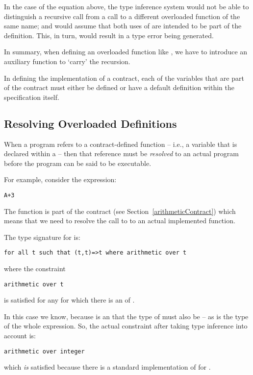 \begin{aside}
\begin{aside}
In the case of the \q{=<} equation above, the type inference system would not be able to distinguish a recursive call from a call to a different overloaded function of the same name; and would assume that both uses of \q{=<} are intended to be part of the definition. This, in turn, would result in a type error being generated.

In summary, when defining an overloaded function like \q{=<}, we have to introduce an auxiliary function to `carry' the recursion.
\end{aside}
\end{aside}

In defining the implementation of a contract, each of the variables that are part of the contract must either be defined or have a default definition within the  specification itself.

\subsection{Resolving Overloaded Definitions}
\label{overloading}

When a program refers to a contract-defined function -- i.e., a variable that is declared within a  -- then that reference must be \emph{resolved} to an actual program before the program can be said to be executable.

For example, consider the expression:
\begin{lstlisting}
A+3
\end{lstlisting}
The \q{(+)} function is part of the  contract (see Section~\vref{arithmeticContract}) which means that we need to resolve the call to \q{(+)} to an actual implemented function.

The type signature for \q{(+)} is:
\begin{lstlisting}
for all t such that (t,t)=>t where arithmetic over t
\end{lstlisting}
where the constraint
\begin{lstlisting}
arithmetic over t
\end{lstlisting}
is satisfied for any  for which there is an  of . 

In this case we know, because  is an  that the type of  must also be  -- as is the type of the whole expression. So, the actual constraint after taking type inference into account is:
\begin{lstlisting}
arithmetic over integer
\end{lstlisting}
which \emph{is} satisfied because there is a standard implementation of  for .

